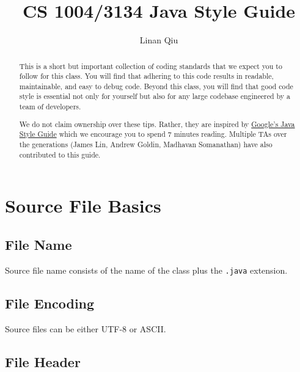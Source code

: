 \documentclass[11pt,DIV=23,landscape]{scrartcl}
\title{CS 1004/3134 Java Style Guide}
\author{Linan Qiu}
\date{}
\begin{document}
\maketitle

\begin{abstract}
This is a short but important collection of coding standards that we
expect you to follow for this class. You will find that adhering to this
code results in readable, maintainable, and easy to debug code. Beyond
this class, you will find that good code style is essential not only for
yourself but also for any large codebase engineered by a team of
developers.

We do not claim ownership over these tips. Rather, they are inspired by
\href{https://google.github.io/styleguide/javaguide.html}{Google's Java
Style Guide} which we encourage you to spend 7 minutes reading. Multiple
TAs over the generations (James Lin, Andrew Goldin, Madhavan
Somanathan) have also contributed to this guide.
\end{abstract}

\section{Source File Basics}\label{source-file-basics}

\begin{paracol}{2}
\begin{leftcolumn}
\subsection{File Name}\label{file-name}

Source file name consists of the name of the class plus the
\lstinline{.java} extension.
\end{leftcolumn}

\begin{rightcolumn}
\subsection{File Encoding}\label{file-encoding}

Source files can be either UTF-8 or ASCII.
\end{rightcolumn}
\end{paracol}

\subsection{File Header}\label{file-header}
\end{document}
